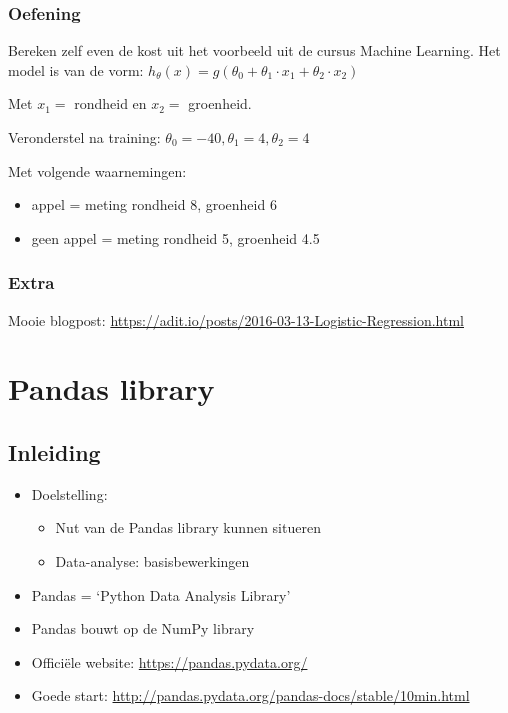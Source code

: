 \documentclass{article}
\begin{document}
\subsubsection{Oefening}

Bereken zelf even de kost uit het voorbeeld uit de cursus Machine Learning. 
Het model is van de vorm: $h_{\theta}(x) = g(\theta_0 + \theta_1\cdot x_1 + \theta_2\cdot x_2)$

Met $x_1 =$ rondheid en $x_2 =$ groenheid.

Veronderstel na training: $\theta_0 = -40, \theta_1 = 4, \theta_2 = 4$

Met volgende waarnemingen: 

\begin{itemize}
    \item appel = meting rondheid 8, groenheid 6
    \item geen appel = meting rondheid 5, groenheid 4.5
\end{itemize}

\subsubsection{Extra}

Mooie blogpost: \url{https://adit.io/posts/2016-03-13-Logistic-Regression.html}


\section{Pandas library}

\subsection{Inleiding}

\begin{itemize}
    \item Doelstelling:
    \begin{itemize}
        \item Nut van de Pandas library kunnen situeren
        \item Data-analyse: basisbewerkingen
    \end{itemize}
    \item Pandas = `Python Data Analysis Library'
    \item Pandas bouwt op de NumPy library
    \item Officiële website: \url{https://pandas.pydata.org/}
    \item Goede start: \url{http://pandas.pydata.org/pandas-docs/stable/10min.html} 
\end{itemize}
\end{document}
